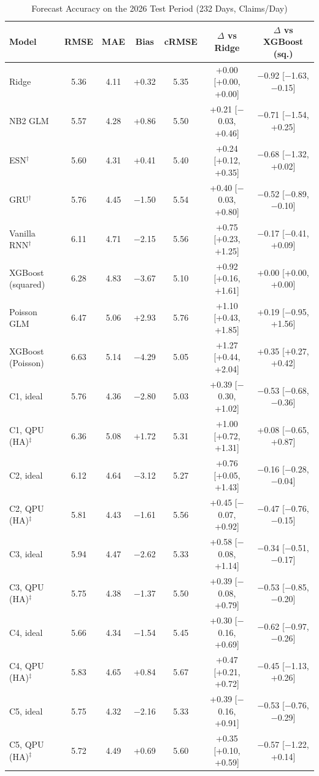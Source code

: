 \documentclass[journal]{IEEEtran}
\begin{document}
\begin{table}[t]
\centering
\caption{Forecast Accuracy on the 2026 Test Period (232 Days, Claims/Day)}
\label{tab:forecast}
\footnotesize
\begin{tabular}{@{}lccccc c@{}}
\toprule
Model & RMSE & MAE & Bias & cRMSE & $\Delta$ vs Ridge & $\Delta$ vs XGBoost (sq.) \\
\midrule
Ridge & 5.36 & 4.11 & +0.32 & 5.35 & +0.00 [+0.00, +0.00] & $-$0.92 [$-$1.63, $-$0.15] \\
NB2 GLM & 5.57 & 4.28 & +0.86 & 5.50 & +0.21 [$-$0.03, +0.46] & $-$0.71 [$-$1.54, +0.25] \\
ESN$^\dagger$ & 5.60 & 4.31 & +0.41 & 5.40 & +0.24 [+0.12, +0.35] & $-$0.68 [$-$1.32, +0.02] \\
GRU$^\dagger$ & 5.76 & 4.45 & $-$1.50 & 5.54 & +0.40 [$-$0.03, +0.80] & $-$0.52 [$-$0.89, $-$0.10] \\
Vanilla RNN$^\dagger$ & 6.11 & 4.71 & $-$2.15 & 5.56 & +0.75 [+0.23, +1.25] & $-$0.17 [$-$0.41, +0.09] \\
XGBoost (squared) & 6.28 & 4.83 & $-$3.67 & 5.10 & +0.92 [+0.16, +1.61] & +0.00 [+0.00, +0.00] \\
Poisson GLM & 6.47 & 5.06 & +2.93 & 5.76 & +1.10 [+0.43, +1.85] & +0.19 [$-$0.95, +1.56] \\
XGBoost (Poisson) & 6.63 & 5.14 & $-$4.29 & 5.05 & +1.27 [+0.44, +2.04] & +0.35 [+0.27, +0.42] \\
\midrule
C1, ideal & 5.76 & 4.36 & $-$2.80 & 5.03 & +0.39 [$-$0.30, +1.02] & $-$0.53 [$-$0.68, $-$0.36] \\
C1, QPU (HA)$^\ddagger$ & 6.36 & 5.08 & +1.72 & 5.31 & +1.00 [+0.72, +1.31] & +0.08 [$-$0.65, +0.87] \\
C2, ideal & 6.12 & 4.64 & $-$3.12 & 5.27 & +0.76 [+0.05, +1.43] & $-$0.16 [$-$0.28, $-$0.04] \\
C2, QPU (HA)$^\ddagger$ & 5.81 & 4.43 & $-$1.61 & 5.56 & +0.45 [$-$0.07, +0.92] & $-$0.47 [$-$0.76, $-$0.15] \\
C3, ideal & 5.94 & 4.47 & $-$2.62 & 5.33 & +0.58 [$-$0.08, +1.14] & $-$0.34 [$-$0.51, $-$0.17] \\
C3, QPU (HA)$^\ddagger$ & 5.75 & 4.38 & $-$1.37 & 5.50 & +0.39 [$-$0.08, +0.79] & $-$0.53 [$-$0.85, $-$0.20] \\
C4, ideal & 5.66 & 4.34 & $-$1.54 & 5.45 & +0.30 [$-$0.16, +0.69] & $-$0.62 [$-$0.97, $-$0.26] \\
C4, QPU (HA)$^\ddagger$ & 5.83 & 4.65 & +0.84 & 5.67 & +0.47 [+0.21, +0.72] & $-$0.45 [$-$1.13, +0.26] \\
C5, ideal & 5.75 & 4.32 & $-$2.16 & 5.33 & +0.39 [$-$0.16, +0.91] & $-$0.53 [$-$0.76, $-$0.29] \\
C5, QPU (HA)$^\ddagger$ & 5.72 & 4.49 & +0.69 & 5.60 & +0.35 [+0.10, +0.59] & $-$0.57 [$-$1.22, +0.14] \\
\bottomrule
\end{tabular}


\end{table}
\end{document}
